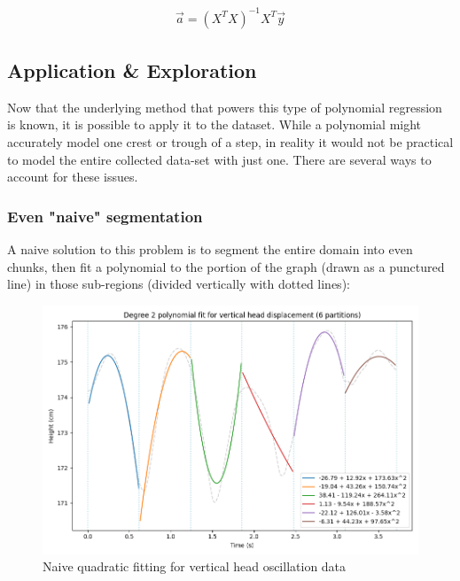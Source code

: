 \documentclass[12pt, a4paper]{article}
\begin{document}
\begin{align*}
    \vec{a}=(X^TX)^{-1}X^T\vec{y}
\end{align*}

\subsection{Application \& Exploration}
Now that the underlying method that powers this type of polynomial regression is
known, it is possible to apply it to the dataset. While a polynomial might
accurately model one crest or trough of a step, in reality it would not be
practical to model the entire collected data-set with just one. There are
several ways to account for these issues. \\

\subsubsection{Even "naive" segmentation}
\label{section_naive_seg}
A naive solution to this problem is to segment the entire domain into even
chunks, then fit a polynomial to the portion of the graph (drawn as a punctured
line) in those sub-regions (divided vertically with dotted lines):

\begin{figure}[H]
    \centering
    \includegraphics[width=12cm]{p_naive_head_2.png}
    \caption{Naive quadratic fitting for vertical head oscillation data}
    \label{naive_head}
\end{figure}
\end{document}
